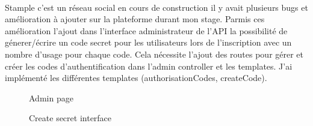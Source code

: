 \paragraph{}
Stample c'est un réseau social en cours de construction il y avait plusieurs bugs et amélioration à ajouter sur la plateforme durant mon stage.
Parmis ces amélioration l'ajout dans l'interface administrateur de l'API la possibilité de génerer/écrire un code
secret pour les utilisateurs lors de l'inscription avec un nombre d'usage pour chaque code.
Cela nécessite l'ajout des routes pour gérer et créer les codes d'authentification dans l'admin 
controller et les templates.
J'ai implémenté les différentes templates (authorisationCodes, createCode).
\begin{figure}[H]
\begin{minipage}[c]{.5\linewidth}
\begin{center}
\caption{Admin page}
\label{fig:Admin page}
\end{center}
\end{minipage}
\hfill
\begin{minipage}[c]{.5\linewidth}
\begin{center}
\hspace{1em}
\caption{Create secret interface}
\label{fig:Create authorisationCode interface}
\end{center}
\end{minipage}
\end{figure}
